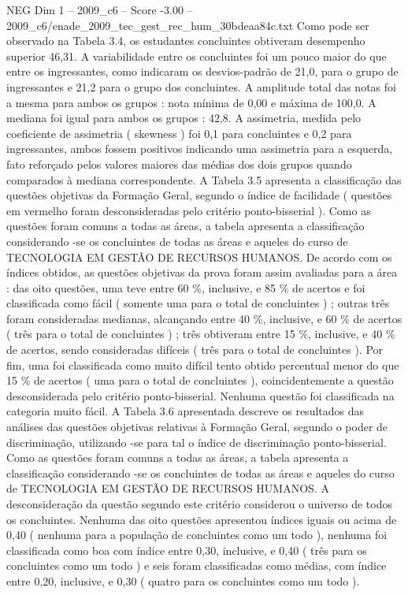 \begin{textsample}{NEG Dim 1 – 2009\_c6 – Score -3.00 – 2009\_c6/enade\_2009\_tec\_gest\_rec\_hum\_30bdeaa84c.txt}
Como pode ser observado na Tabela 3.4, os estudantes concluintes obtiveram desempenho superior 46,31.
A variabilidade entre os concluintes foi um pouco maior do que entre os ingressantes, como indicaram os desvios-padrão de 21,0, para o grupo de ingressantes e 21,2 para o grupo dos concluintes.
A amplitude total das notas foi a mesma para ambos os grupos : nota mínima de 0,00 e máxima de 100,0.
A mediana foi igual para ambos os grupos : 42,8.
A assimetria, medida pelo coeficiente de assimetria ( skewness ) foi 0,1 para concluintes e 0,2 para ingressantes, ambos fossem positivos indicando uma assimetria para a esquerda, fato reforçado pelos valores maiores das médias dos dois grupos quando comparados à mediana correspondente.
A Tabela 3.5 apresenta a classificação das questões objetivas da Formação Geral, segundo o índice de facilidade ( questões em vermelho foram desconsideradas pelo critério ponto-bisserial ).
Como as questões foram comuns a todas as áreas, a tabela apresenta a classificação considerando -se os concluintes de todas as áreas e aqueles do curso de TECNOLOGIA EM GESTÃO DE RECURSOS HUMANOS.
De acordo com os índices obtidos, as questões objetivas da prova foram assim avaliadas para a área : das oito questões, uma teve entre 60 \%, inclusive, e 85 \% de acertos e foi classificada como fácil ( somente uma para o total de concluintes ) ; outras três foram consideradas medianas, alcançando entre 40 \%, inclusive, e 60 \% de acertos ( três para o total de concluintes ) ; três obtiveram entre 15 \%, inclusive, e 40 \% de acertos, sendo consideradas difíceis ( três para o total de concluintes ).
Por fim, uma foi classificada como muito difícil tento obtido percentual menor do que 15 \% de acertos ( uma para o total de concluintes ), coincidentemente a questão desconsiderada pelo critério ponto-bisserial.
Nenhuma questão foi classificada na categoria muito fácil.
A Tabela 3.6 apresentada descreve os resultados das análises das questões objetivas relativas à Formação Geral, segundo o poder de discriminação, utilizando -se para tal o índice de discriminação ponto-bisserial.
Como as questões foram comuns a todas as áreas, a tabela apresenta a classificação considerando -se os concluintes de todas as áreas e aqueles do curso de TECNOLOGIA EM GESTÃO DE RECURSOS HUMANOS.
A desconsideração da questão segundo este critério considerou o universo de todos os concluintes.
Nenhuma das oito questões apresentou índices iguais ou acima de 0,40 ( nenhuma para a população de concluintes como um todo ), nenhuma foi classificada como boa com índice entre 0,30, inclusive, e 0,40 ( três para os concluintes como um todo ) e seis foram classificadas como médias, com índice entre 0,20, inclusive, e 0,30 ( quatro para os concluintes como um todo ).

\end{textsample}
